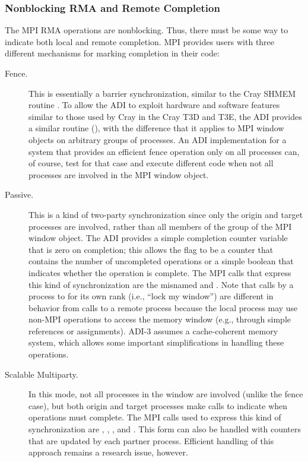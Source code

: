 \subsubsection{Nonblocking RMA and Remote Completion}
The MPI RMA operations are nonblocking.  Thus, there must be some way
to indicate both local and remote completion.  MPI provides users
with three different mechanisms for marking completion in their code:
\begin{description}
\item[Fence.]This is essentially a barrier synchronization, similar to
the Cray SHMEM routine .  To allow the ADI to exploit
hardware and 
software features similar to those used by Cray  in the
Cray T3D and T3E, the ADI provides a similar routine
(), with the 
difference that it applies to MPI window objects on arbitrary groups
of processes. An ADI implementation for a system that
provides an efficient fence operation only on all processes can, of
course, test for that case and execute different code when not all
processes are involved in the MPI window object.

\item[Passive.]This is a kind of two-party synchronization since only
the origin and target processes are involved, rather than all members of the
group of the MPI window object.  The ADI provides a
simple completion counter variable that is zero on completion; this allows the
flag to be a counter that contains the number of uncompleted
operations or a simple boolean that indicates whether the operation is
complete.  The MPI calls that express this kind of synchronization are the
misnamed 
 and .  Note that calls by a
process to  for its own rank (i.e., ``lock my
window'') are different in behavior from calls to a remote process
because the local process may use non-MPI operations to access the
memory window (e.g., through simple references or assignments).  ADI-3
assumes a cache-coherent memory system, which allows some important
simplifications in handling these operations.

\item[Scalable Multiparty.]In this mode, not all processes in the
window are involved (unlike the fence case), but both origin and
target processes make calls to indicate when operations must complete.
The MPI calls used to express this kind of synchronization are
, , ,
and .
This form can also be handled with counters that are updated by each
partner process.  Efficient handling of this approach remains a
research issue, however.
\end{description}

